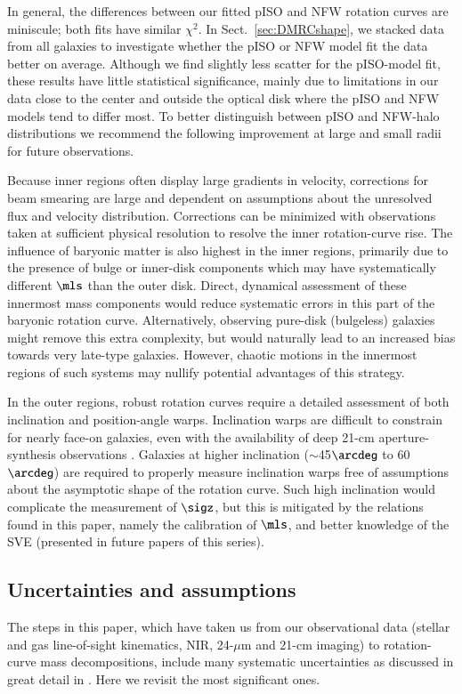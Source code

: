 \documentclass[traditabstract]{aa} %
\begin{document}
In general, the differences between our fitted pISO and NFW rotation curves are miniscule;
both fits have similar $\chi^2$. In Sect.~\ref{sec:DMRCshape}, we stacked data from all
galaxies to investigate whether the pISO or NFW model fit the data better on average.
Although we find slightly less scatter for the pISO-model fit, these results have little
statistical significance, mainly due to limitations in our data close to the center and
outside the optical disk where the pISO and NFW models tend to differ most. To better
distinguish between pISO and NFW-halo distributions we recommend the following improvement
at large and small radii for future observations.

Because inner regions often display large gradients in velocity, corrections for beam
smearing are large and dependent on assumptions about the unresolved flux and velocity
distribution. Corrections can be minimized with observations taken at sufficient physical
resolution to resolve the inner rotation-curve rise. The influence of baryonic matter is
also highest in the inner regions, primarily due to the presence of bulge or inner-disk
components which may have systematically different $\mls$ than the outer disk. Direct,
dynamical assessment of these innermost mass components would reduce systematic errors in
this part of the baryonic rotation curve. Alternatively, observing pure-disk (bulgeless)
galaxies might remove this extra complexity, but would naturally lead to an increased bias
towards very late-type galaxies. However, chaotic motions in the innermost regions of such
systems \citep{swaters2003b} may nullify potential advantages of this strategy.

In the outer regions, robust rotation curves require a detailed assessment of both
inclination and position-angle warps.  Inclination warps are difficult to constrain for
nearly face-on galaxies, even with the availability of deep 21-cm aperture-synthesis
observations \citep{martinsson2011}. Galaxies at higher inclination ($\sim$45$\arcdeg$ to
60$\arcdeg$) are required to properly measure inclination warps free of assumptions about
the asymptotic shape of the rotation curve. Such high inclination would complicate the
measurement of $\sigz$, but this is mitigated by the relations found in this paper, namely
the calibration of $\mls$, and better knowledge of the SVE (presented in future papers of
this series).


\subsection{Uncertainties and assumptions}
\label{sec:Disc-uncert}
The steps in this paper, which have taken us from our observational data (stellar and gas 
line-of-sight kinematics, NIR, 24-$\mu$m and 21-cm imaging) to rotation-curve mass 
decompositions, include many systematic uncertainties as discussed in great detail in 
. Here we revisit the most significant ones.
\end{document}
